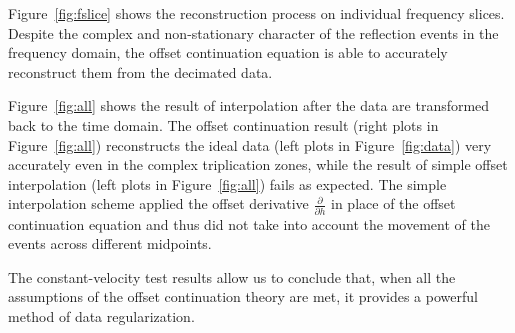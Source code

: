 

\par
Figure~\ref{fig:fslice} shows the reconstruction process on individual
frequency slices. Despite the complex and non-stationary character of
the reflection events in the frequency domain, the offset continuation
equation is able to accurately reconstruct them from the decimated
data.


\par
Figure~\ref{fig:all} shows the result of interpolation after the data
are transformed back to the time domain. The offset continuation
result (right plots in Figure~\ref{fig:all}) reconstructs the ideal
data (left plots in Figure~\ref{fig:data}) very accurately even in
the complex triplication zones, while the result of simple offset
interpolation (left plots in Figure~\ref{fig:all}) fails as expected.
The simple interpolation scheme applied the offset derivative 
$\frac{\partial}{\partial h}$
in place of the offset continuation equation and thus did not take
into account the movement of the events across different midpoints.


\par
The constant-velocity test results allow us to conclude that, when all
the assumptions of the offset continuation theory are met, it provides
a powerful method of data regularization. 

